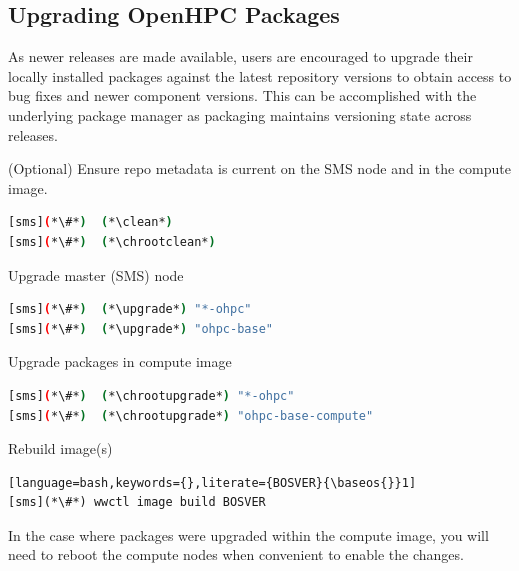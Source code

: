 \subsection{Upgrading OpenHPC Packages}  \label{appendix:upgrade}

As newer \OHPC{} releases are made available, users are encouraged to upgrade
their locally installed packages against the latest repository versions to
obtain access to bug fixes and newer component versions. This can be
accomplished with the underlying package manager as \OHPC{} packaging maintains
versioning state across releases.

\begin{enumerate*}
\item (Optional) Ensure repo metadata is current on the SMS node and in the
compute image.

\begin{lstlisting}[language=bash,keywords={}]
[sms](*\#*)  (*\clean*)
[sms](*\#*)  (*\chrootclean*)
\end{lstlisting}

\item Upgrade master (SMS) node

\begin{lstlisting}[language=bash,keywords={}]
[sms](*\#*)  (*\upgrade*) "*-ohpc"
[sms](*\#*)  (*\upgrade*) "ohpc-base"
\end{lstlisting}

\item Upgrade packages in compute image

\begin{lstlisting}[language=bash,keywords={}]
[sms](*\#*)  (*\chrootupgrade*) "*-ohpc"
[sms](*\#*)  (*\chrootupgrade*) "ohpc-base-compute"
\end{lstlisting}

\item Rebuild image(s)

\begin{lstlisting}[language=bash,keywords={},literate={BOSVER}{\baseos{}}1]
[sms](*\#*) wwctl image build BOSVER
\end{lstlisting}
\end{enumerate*}

\noindent In the case where packages were upgraded within the compute image,
you will need to reboot the compute nodes when convenient to enable the changes.
